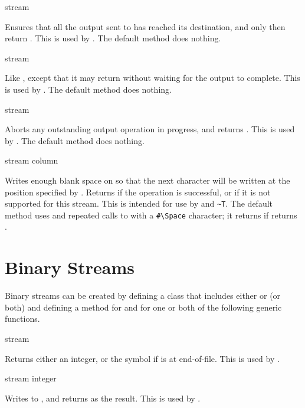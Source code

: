  {stream}

Ensures that all the output sent to  has reached its destination,
and only then return .  This is used by .  The
default method does nothing.

 {stream}

Like , except that it may return  without
waiting for the output to complete.  This is used by .  The
default method does nothing.

 {stream}

Aborts any outstanding output operation in progress, and returns .
This is used by .  The default method does nothing.

 {stream column}

Writes enough blank space on  so that the next character will be
written at the position specified by .  Returns  if the
operation is successful, or  if it is not supported for this stream.
This is intended for use by  and  \verb+~T+.  The default
method uses  and repeated calls to 
with a \verb+#\Space+ character; it returns  if 
returns .


\section {Binary Streams}

Binary streams can be created by defining a class that includes either
 or 
(or both) and defining a method for  and for one or both
of the following generic functions.

 {stream}

Returns either an integer, or the symbol  if  is at
end-of-file.  This is used by .

 {stream integer}

Writes  to , and returns  as the
result.  This is used by .

